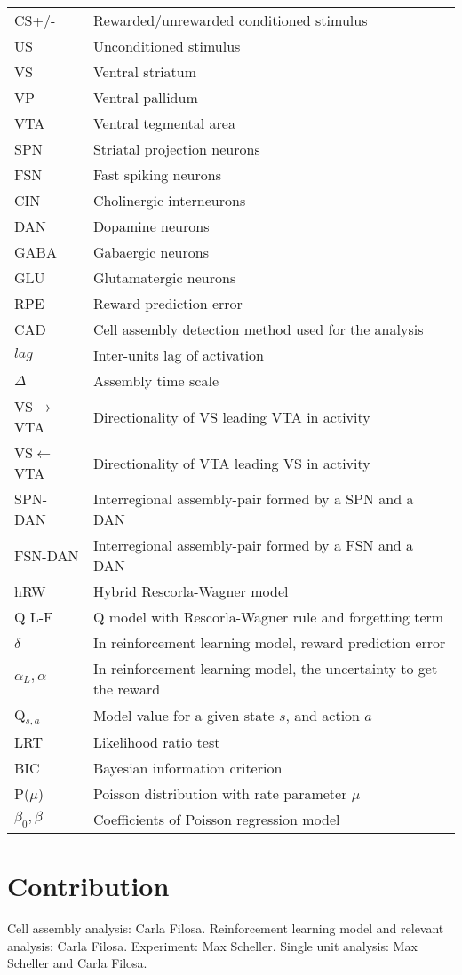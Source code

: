 \begin{tabular}{l l}
CS+/- &{Rewarded/unrewarded conditioned stimulus}\\
US &{Unconditioned stimulus}\\
VS &{Ventral striatum}\\
VP &{Ventral pallidum}\\
VTA &{Ventral tegmental area}\\
SPN &{Striatal projection neurons}\\
FSN &{Fast spiking neurons}\\
CIN &{Cholinergic interneurons}\\
DAN &{Dopamine neurons}\\
GABA &{Gabaergic neurons}\\
GLU &{Glutamatergic neurons}\\
RPE &{Reward prediction error}\\
CAD &{Cell assembly detection method used for the analysis}\\
$lag$ &{Inter-units lag of activation}\\
$\Delta$ &{Assembly time scale}\\
VS$\rightarrow$VTA &{Directionality of VS leading VTA in activity}\\
VS$\leftarrow$VTA &{Directionality of VTA leading VS in activity}\\
SPN-DAN &{Interregional assembly-pair formed by a SPN and a DAN}\\
FSN-DAN &{Interregional assembly-pair formed by a FSN and a DAN}\\
hRW &{Hybrid Rescorla-Wagner model}\\
Q L-F &{Q model with Rescorla-Wagner rule and forgetting term}\\
$\delta$ &{In reinforcement learning model, reward prediction error}\\
$\alpha_L,\alpha$ &{In reinforcement learning model, the uncertainty to get the reward}\\
Q$_{s,a}$ &{Model value for a given state $s$, and action $a$}\\
LRT &{Likelihood ratio test}\\
BIC &{Bayesian information criterion}\\
P($\mu$) &{Poisson distribution with rate parameter $\mu$}\\
$\beta_0,\beta$ &{Coefficients of Poisson regression model}\\
\end{tabular}
\pagebreak
\section*{Contribution}
Cell assembly analysis: Carla Filosa. Reinforcement learning model and relevant analysis: Carla Filosa. Experiment: Max Scheller. Single unit analysis: Max Scheller and Carla Filosa. 